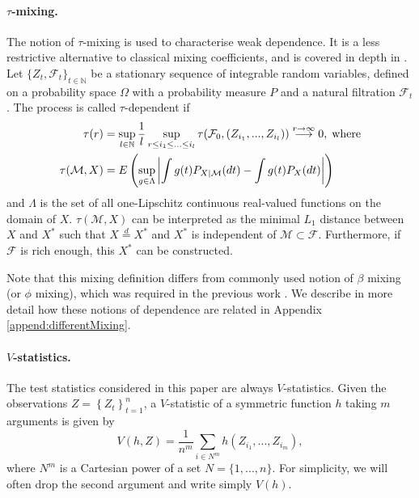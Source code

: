 \paragraph{$\tau$-mixing.} The notion of $\tau$-mixing is used to characterise weak dependence. It is a less restrictive alternative to classical mixing coefficients, and is covered in depth in \cite{dedecker2007weak}. Let $\{Z_t,\mathcal{F}_t\}_{t \in \mathbb{N}}$  be a stationary sequence of integrable random variables, defined on a probability space $\Omega$ with a probability measure $P$ and a natural filtration $\mathcal{F}_t$. The process  is called $\tau$-dependent if 
\begin{align*}
\tau(r) &= \sup_{l \in \mathbb{N}} \frac 1 l \sup_{ r \leq i_1 \leq ... \leq i_l} \tau( \mathcal F_0,(Z_{i_1},...,Z_{i_l}) )  \overset{r \to \infty}{\longrightarrow} 0,\;\text{where} \\
\tau(\mathcal{M},X) &=  E \left( \sup_{g \in \Lambda} \left| \int g(t) P_{X|\mathcal{M}}(dt) - \int g(t) P_X(dt) \right| \right)
\end{align*}
and $\Lambda$ is the set of all one-Lipschitz continuous real-valued functions on the domain of $X$. $\tau(\mathcal M,X)$ can be interpreted as the minimal $L_1$ distance between $X$ and $X^*$ such that $X \overset{d}{=}X^*$ and $X^*$ is independent of $\mathcal M \subset \mathcal F$. Furthermore, if $\mathcal F$ is rich enough, this $X^*$ can be constructed.

Note that this mixing definition differs from commonly used notion of $\beta$ mixing (or $\phi$ mixing),  which was required in the previous work \cite{chwialkowski2014kernel}. We describe in more detail how these notions of dependence are related in Appendix \ref{append:differentMixing}.
%  
\paragraph{$V$-statistics.} The test statistics considered in this paper are always $V$-statistics. Given the observations $Z=\left\{Z_t\right\}_{t=1}^n$, a $V$-statistic of a symmetric function $h$ taking $m$ arguments is given by 
\begin{equation}
\label{def:Vstat}
V(h,Z) = \frac{1}{n^m} \sum_{i \in N^m} \nolimits h(Z_{i_1},...,Z_{i_m}),
\end{equation}
where $N^m$ is a Cartesian power of a set $N= \{1,...,n\}$. For simplicity, we will often drop the second argument and write simply $V(h)$. 

